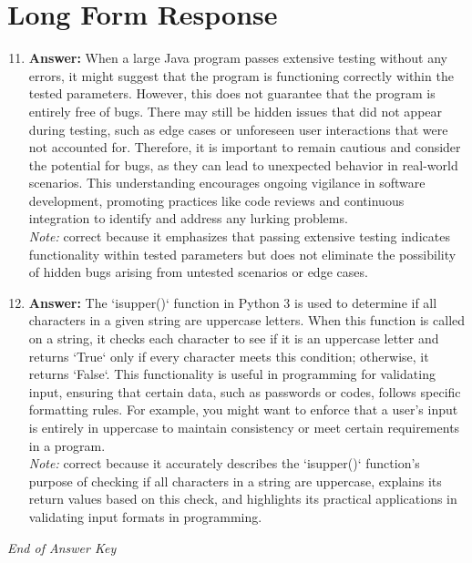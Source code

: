 \documentclass[12pt]{article}
\begin{document}
\section*{Long Form Response}
\begin{enumerate}[label=\arabic*.]
\setcounter{enumi}{10}
\item \textbf{Answer:} When a large Java program passes extensive testing without any errors, it might suggest that the program is functioning correctly within the tested parameters. However, this does not guarantee that the program is entirely free of bugs. There may still be hidden issues that did not appear during testing, such as edge cases or unforeseen user interactions that were not accounted for. Therefore, it is important to remain cautious and consider the potential for bugs, as they can lead to unexpected behavior in real-world scenarios. This understanding encourages ongoing vigilance in software development, promoting practices like code reviews and continuous integration to identify and address any lurking problems.
\\ \textit{Note:} correct because it emphasizes that passing extensive testing indicates functionality within tested parameters but does not eliminate the possibility of hidden bugs arising from untested scenarios or edge cases.
\item \textbf{Answer:} The `isupper()` function in Python 3 is used to determine if all characters in a given string are uppercase letters. When this function is called on a string, it checks each character to see if it is an uppercase letter and returns `True` only if every character meets this condition; otherwise, it returns `False`. This functionality is useful in programming for validating input, ensuring that certain data, such as passwords or codes, follows specific formatting rules. For example, you might want to enforce that a user's input is entirely in uppercase to maintain consistency or meet certain requirements in a program.
\\ \textit{Note:} correct because it accurately describes the `isupper()` function's purpose of checking if all characters in a string are uppercase, explains its return values based on this check, and highlights its practical applications in validating input formats in programming.
\end{enumerate}

\vfill
\noindent\textit{End of Answer Key}
\end{document}
